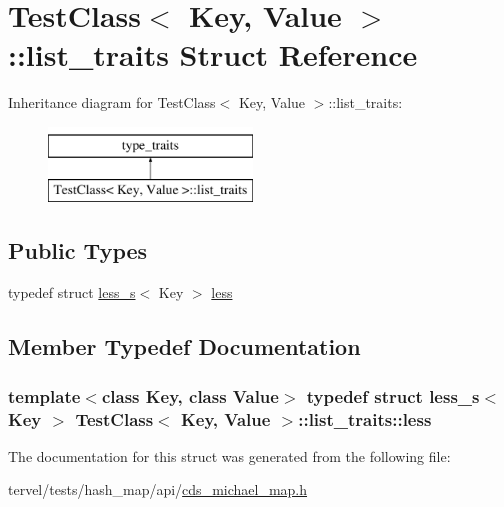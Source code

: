 \hypertarget{struct_test_class_1_1list__traits}{}\section{Test\+Class$<$ Key, Value $>$\+:\+:list\+\_\+traits Struct Reference}
\label{struct_test_class_1_1list__traits}
Inheritance diagram for Test\+Class$<$ Key, Value $>$\+:\+:list\+\_\+traits\+:\begin{figure}[H]
\begin{center}
\leavevmode
\includegraphics[height=2.000000cm]{struct_test_class_1_1list__traits}
\end{center}
\end{figure}
\subsection*{Public Types}
\begin{DoxyCompactItemize}
\item 
typedef struct \hyperlink{struct_test_class_1_1less__s}{less\+\_\+s}$<$ Key $>$ \hyperlink{struct_test_class_1_1list__traits_ae7d3e41718101d189b822e03a4cbb56b}{less}
\end{DoxyCompactItemize}


\subsection{Member Typedef Documentation}
\hypertarget{struct_test_class_1_1list__traits_ae7d3e41718101d189b822e03a4cbb56b}{}
\subsubsection[{less}]{\setlength{\rightskip}{0pt plus 5cm}template$<$class Key, class Value$>$ typedef struct {\bf less\+\_\+s}$<$ Key $>$ {\bf Test\+Class}$<$ Key, {\bf Value} $>$\+::{\bf list\+\_\+traits\+::less}}\label{struct_test_class_1_1list__traits_ae7d3e41718101d189b822e03a4cbb56b}


The documentation for this struct was generated from the following file\+:\begin{DoxyCompactItemize}
\item 
tervel/tests/hash\+\_\+map/api/\hyperlink{cds__michael__map_8h}{cds\+\_\+michael\+\_\+map.\+h}\end{DoxyCompactItemize}
